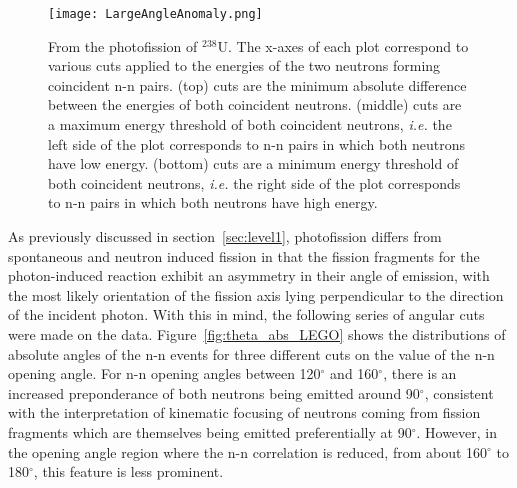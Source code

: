 \begin{figure}
\centering
    \texttt{[image: LargeAngleAnomaly.png]}
    \caption{From the photofission of $^{238}$U. The x-axes of each plot correspond to various cuts applied to the energies of the two neutrons forming coincident n-n pairs.
     (top) cuts are the minimum absolute difference between the energies of both coincident neutrons.
    (middle) cuts are a maximum energy threshold of both coincident neutrons, \textit{i.e.} the left side of the plot corresponds to n-n pairs in which both neutrons have low energy.
    (bottom) cuts are a minimum energy threshold of both coincident neutrons, \textit{i.e.} the right side of the plot corresponds to n-n pairs in which both neutrons have high energy.
}
    \label{fig:LargeAngleAnomaly}
\end{figure}


As previously discussed in section~\ref{sec:level1}, photofission differs from spontaneous and neutron induced fission in that the fission fragments for the photon-induced reaction exhibit an asymmetry in their angle of emission, with the most likely orientation of the fission axis lying perpendicular to the direction of the incident photon.
With this in mind, the following series of angular cuts were made on the data.
Figure~\ref{fig:theta_abs_LEGO} shows the distributions of absolute angles of the n-n events for three different cuts on the value of the n-n opening angle.
For n-n opening angles between 120$^{\circ}$ and 160$^{\circ}$, there is an increased preponderance of both neutrons being emitted around 90$^{\circ}$, consistent with the interpretation of kinematic focusing of neutrons coming from fission fragments which are themselves being emitted preferentially at 90$^{\circ}$.
However, in the opening angle region where the n-n correlation is reduced, from about 160$^{\circ}$ to 180$^{\circ}$, this feature is less prominent.

